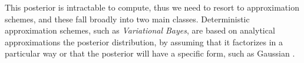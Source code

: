 This posterior is intractable to compute, thus we need to resort to approximation schemes, and these fall broadly into two main classes. Deterministic approximation schemes, such as \emph{Variational Bayes}, are based on analytical approximations the posterior distribution, by assuming that it factorizes in a particular way or that the posterior will have a specific form, such as Gaussian \cite[Ch. 10]{Bishop2006}.  
